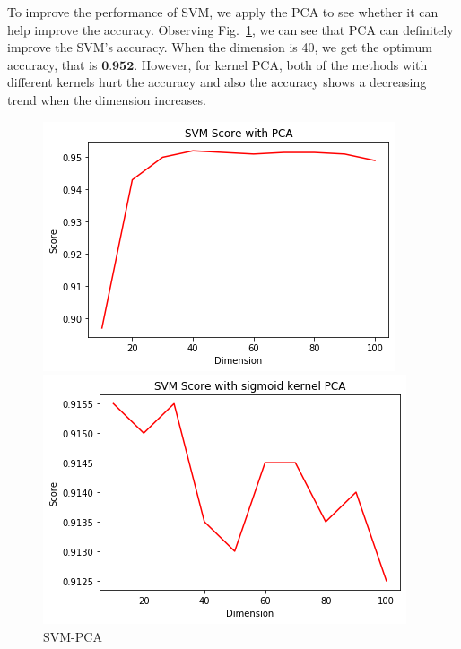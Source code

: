 \documentclass[12pt]{article}
\begin{document}
To improve the performance of SVM, we apply the PCA to see whether it can help improve the accuracy. Observing Fig.~\ref{fig:SVM-PCA}, we can see that PCA can definitely improve the SVM's accuracy. When the dimension is 40, we get the optimum accuracy, that is $\textbf{0.952}$. However, for kernel PCA, both of the methods with different kernels hurt the accuracy and also the accuracy shows a decreasing trend when the dimension increases.

\begin{figure}[htb]
	\centering
	\begin{minipage}{.3\textwidth}
		\centering
		\includegraphics[width=\linewidth]{./exp-figs/SVM-PCA.png}
		\caption{SVM-PCA}
		\label{fig:SVM-PCA}
	\end{minipage}%
	\begin{minipage}{0.3\textwidth}
		\centering
		\includegraphics[width=\linewidth]{./exp-figs/SVM-SIG-KPCA.png}

\end{minipage}
\end{figure}
\end{document}
